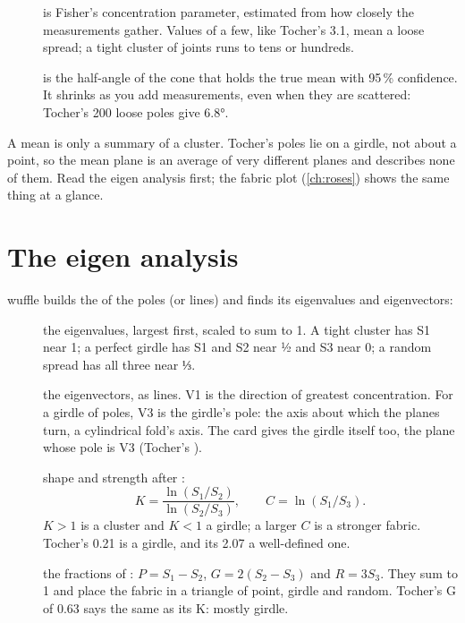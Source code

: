 \begin{description}
\item[] is Fisher's concentration parameter, estimated from how closely the measurements gather.
Values of a few, like Tocher's 3.1, mean a loose spread; a tight cluster of joints runs to tens or
hundreds.
\item[] is the half-angle of the cone that holds the true mean with 95\,\% confidence. It shrinks
as you add measurements, even when they are scattered: Tocher's 200 loose poles give 6.8°.
\end{description}

\begin{caution}
A mean is only a summary of a cluster. Tocher's poles lie on a girdle, not about a point, so the mean
plane  is an average of very different planes and describes none of them. Read the eigen
analysis first; the fabric plot (\cref{ch:roses}) shows the same thing at a glance.
\end{caution}

\section{The eigen analysis}\label{sec:stats-eigen}

wuffle builds the  of the poles (or lines) and finds its eigenvalues and eigenvectors:

\begin{description}
\item[] the eigenvalues, largest first, scaled to sum to 1. A tight cluster has S1 near 1; a
perfect girdle has S1 and S2 near ½ and S3 near 0; a random spread has all three near ⅓.
\item[] the eigenvectors, as lines. V1 is the direction of greatest concentration. For a
girdle of poles, V3 is the girdle's pole: the axis about which the planes turn, a cylindrical fold's
axis. The card gives the girdle itself too, the plane whose pole is V3 (Tocher's ).
\item[] shape and strength after \textcite{woodcock1977}:
\[ K = \frac{\ln(S_1/S_2)}{\ln(S_2/S_3)}, \qquad C = \ln(S_1/S_3). \] $K > 1$ is a cluster and $K < 1$ a girdle; a larger $C$ is a stronger fabric. Tocher's
0.21 is a girdle, and its 2.07 a well-defined one.
\item[] the fractions of \textcite{vollmer1990}: $P = S_1 - S_2$, $G = 2(S_2 - S_3)$ and $R = 3S_3$.
They sum to 1 and place the fabric in a triangle of point, girdle and random. Tocher's G of 0.63 says the
same as its K: mostly girdle.
\end{description}

